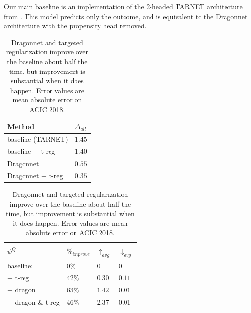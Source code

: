 \documentclass{article}
\begin{document}
Our main baseline is an implementation of the 2-headed TARNET architecture from \citet{shalit2016estimating}.
This model predicts only the outcome, and is equivalent to the Dragonnet architecture with the propensity head removed.
\begin{table}[htb] 
\begin{minipage}{.4\textwidth}
\centering
 \captionsetup{width=1.2\linewidth}
  \caption{Dragonnet and targeted regularization improve estimation on average on ACIC 2018. Table entries are mean absolute error over all datasets. }
     \vspace{1em}
      \label{tb:acic2018_meanerror}
  \vspace{1em}
 \begin{tabular}{ll}
    \toprule
    Method    & $\Delta_{all}$   \\
\midrule
   baseline (TARNET) &$1.45 $\\
  baseline + t-reg & $1.40$ \\
   Dragonnet & $0.55$  \\
   Dragonnet + t-reg & 
  \cellcolor[gray]{0.8}$0.35$ \\
    \bottomrule
\end{tabular}
\end{minipage}
\qquad
\hspace{1.5em}
\begin{minipage}{.4\textwidth}
 \captionsetup{width=1.2\linewidth}
  \caption{Dragonnet and targeted regularization improve over the baseline about half the time,
    but improvement is substantial when it does happen.
  Error values are mean absolute error on ACIC 2018.}
  \label{tb:acic2018_typicalcase}
  \vspace{1em}
 \begin{tabular}{llll}
    \toprule
    $\psi^{Q}$     & $\%_{improve}$     & $\uparrow_{avg}$ &  $\downarrow_{avg}$\\
    \midrule
    baseline:  & $0\% $ & $0$ &$0$\\
        \midrule
    + t-reg & $42\%$ & $0.30$  &$0.11$ \\
   + dragon &$63\%$ & $1.42$ & $0.01$ \\
  + dragon \& t-reg  & \cellcolor[gray]{0.8}$46\%$ & \cellcolor[gray]{0.8}2.37 & \cellcolor[gray]{0.8}0.01 \\
    \bottomrule
  \end{tabular}
\end{minipage}
\end{table}
\end{document}
